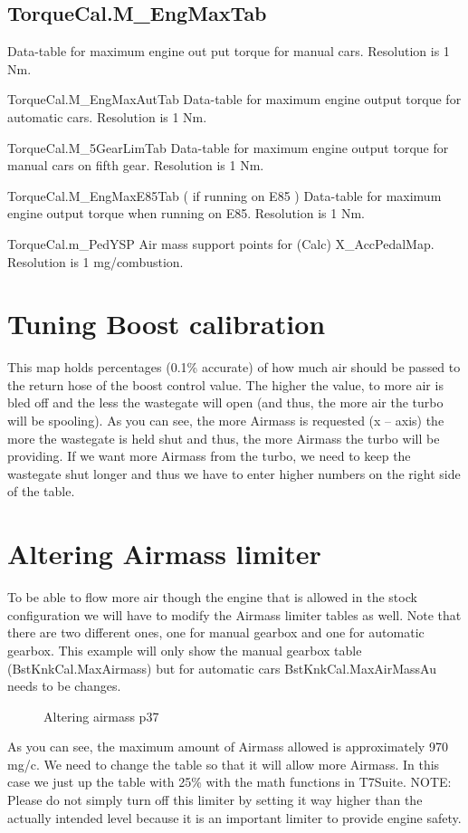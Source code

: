\documentclass[11pt,a4paper]{book}
\newcommand{\Mfig}[1]{%
\begin{figure}[<+htpb+>]
    \centering
    \missingfigure{#1}
    \caption{#1}
\end{figure}}
\begin{document}
\subsection{TorqueCal.M\_EngMaxTab}
Data-table for maximum engine out put torque for manual cars. Resolution is 1 Nm.

TorqueCal.M\_EngMaxAutTab
Data-table for maximum engine output torque for automatic cars. Resolution is 1 Nm.

TorqueCal.M\_5GearLimTab
Data-table for maximum engine output torque for manual cars on fifth gear. Resolution is 1 Nm.


TorqueCal.M\_EngMaxE85Tab ( if running on E85 )
Data-table for maximum engine output torque when running on E85. Resolution is 1 Nm.

TorqueCal.m\_PedYSP
Air mass support points for (Calc) X\_AccPedalMap. Resolution is 1 mg/combustion.

\section{Tuning Boost calibration}
This map holds percentages (0.1\% accurate) of how much air should be passed to the return hose of
the boost control value. The higher the value, to more air is bled off and the less the wastegate will
open (and thus, the more air the turbo will be spooling). As you can see, the more Airmass is
requested (x – axis) the more the wastegate is held shut and thus, the more Airmass the turbo will be
providing. If we want more Airmass from the turbo, we need to keep the wastegate shut longer and
thus we have to enter higher numbers on the right side of the table.

\section{Altering Airmass limiter}
To be able to flow more air though the engine that is allowed in the stock configuration we will have
to modify the Airmass limiter tables as well. Note that there are two different ones, one for manual
gearbox and one for automatic gearbox. This example will only show the manual gearbox table
(BstKnkCal.MaxAirmass) but for automatic cars BstKnkCal.MaxAirMassAu needs to be changes.

\Mfig{Altering airmass p37}

As you can see, the maximum amount of Airmass allowed is approximately 970 mg/c. We need to
change the table so that it will allow more Airmass. In this case we just up the
table with 25\% with
the math functions in T7Suite.
NOTE: Please do not simply turn off this limiter by setting it way higher than the actually intended
level because it is an important limiter to provide engine safety.
\end{document}
